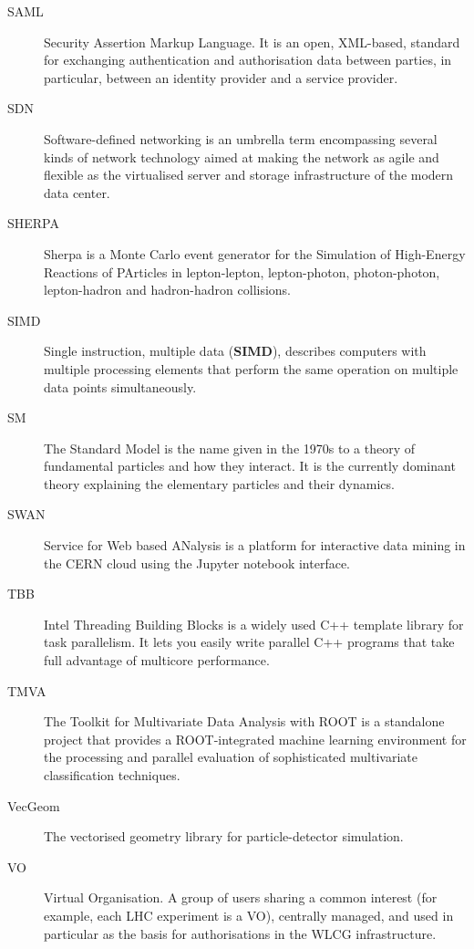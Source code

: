 \documentclass[twocolumn]{svjour3}          %
\begin{document}
\begin{appendices}
\begin{description}
\item[SAML] Security Assertion Markup Language. It is an open, XML-based,
standard for exchanging authentication and authorisation data between
parties, in particular, between an identity provider and a service
provider.

\item[SDN] Software-defined networking is an umbrella term encompassing several kinds of network technology aimed at making the network as agile
and flexible as the virtualised server and storage infrastructure of the modern data center.

\item[SHERPA] Sherpa is a Monte Carlo event generator for the Simulation of
High-Energy Reactions of PArticles in lepton-lepton, lepton-photon,
photon-photon, lepton-hadron and hadron-hadron collisions.

\item[SIMD] Single instruction, multiple data (\textbf{SIMD}), describes
computers with multiple processing elements that perform the same
operation on multiple data points simultaneously.

\item[SM] The Standard Model is the name given in the 1970s to a theory of
fundamental particles and how they interact. It is the currently
dominant theory explaining the elementary particles and their dynamics.

\item[SWAN] Service for Web based ANalysis is a platform for interactive data
mining in the CERN cloud using the Jupyter notebook interface.

\item[TBB] Intel Threading Building Blocks is a widely used C++ template
library for task parallelism. It lets you easily write parallel C++
programs that take full advantage of multicore performance.

\item[TMVA] The Toolkit for Multivariate Data Analysis with ROOT is a
standalone project that provides a ROOT-integrated machine learning
environment for the processing and parallel evaluation of sophisticated
multivariate classification techniques.

\item[VecGeom] The vectorised geometry library for particle-detector simulation.

\item[VO] Virtual Organisation. A group of users sharing a common interest
(for example, each LHC experiment is a VO), centrally managed, and used
in particular as the basis for authorisations in the WLCG
infrastructure.


\end{description}
\end{appendices}
\end{document}
